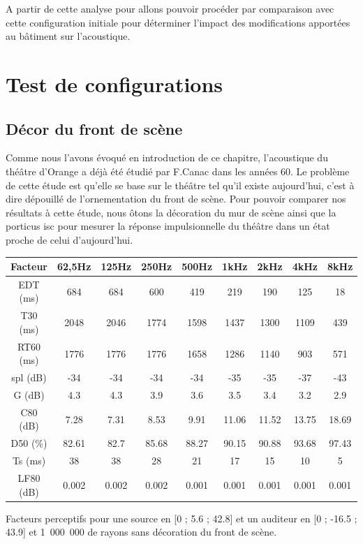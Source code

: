 A partir de cette analyse pour allons pouvoir procéder par comparaison avec cette configuration initiale pour déterminer l'impact des modifications apportées au bâtiment sur l'acoustique.
		
\chapter{Test de configurations}
	\minitoc
	\newpage

\section{Décor du front de scène}

Comme nous l'avons évoqué en introduction de ce chapitre, l'acoustique du théâtre d'Orange a déjà été étudié par F.Canac dans les années 60. Le problème de cette étude est qu'elle se base sur le théâtre tel qu'il existe aujourd'hui, c'est à dire dépouillé de l'ornementation du front de scène. Pour pouvoir comparer nos résultats à cette étude, nous ôtons la décoration du mur de scène ainsi que la \gls{porticus isc} pour mesurer la réponse impulsionnelle du théâtre dans un état proche de celui d'aujourd'hui. 

\begin{tableth} 
 \begin{tabular}{| *{9}{c|}} 
 \hline 
 Facteur & 62,5Hz & 125Hz & 250Hz & 500Hz & 1kHz & 2kHz & 4kHz & 8kHz \\ 
 \hline 
 \hline 
\gls{EDT} (ms)& 684& 684& 600& 419& 219& 190& 125& 18 \\ 
 \hline 
\gls{T30} (ms)& 2048& 2046& 1774& 1598& 1437& 1300& 1109& 439 \\ 
 \hline 
\gls{RT60} (ms)& 1776& 1776& 1776& 1658& 1286& 1140& 903& 571 \\ 
 \hline 
\gls{spl} (dB)& -34& -34& -34& -34& -35& -35& -37& -43 \\ 
 \hline 
\gls{G} (dB)& 4.3& 4.3& 3.9& 3.6& 3.5& 3.4& 3.2& 2.9 \\
 \hline 
\gls{C80} (dB)& 7.28& 7.31& 8.53& 9.91& 11.06& 11.52& 13.75& 18.69 \\ 
 \hline 
\gls{D50} (\%)& 82.61& 82.7& 85.68& 88.27& 90.15& 90.88& 93.68& 97.43 \\ 
 \hline 
\gls{Ts} (ms)& 38& 38& 28& 21& 17& 15& 10& 5 \\ 
 \hline 
\gls{LF80} (dB)& 0.002& 0.002& 0.002& 0.001& 0.001& 0.001& 0.001& 0.001 \\ 
 \hline 
\end{tabular} 
 \caption{Facteurs perceptifs pour une source en [0 ; 5.6 ; 42.8] et un auditeur en [0 ; -16.5 ; 43.9] et 1~000~000 de rayons sans décoration du front de scène.} 
 \label{tab_fact_init} 
 \end{tableth}

